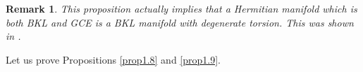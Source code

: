 \documentclass{amsart}
\numberwithin{equation}{section}
\newtheorem{remark}  [theorem]     {Remark}
\theoremstyle{definition}
\renewcommand{\1}{\mathds{1}}
\renewcommand{\>}{\rightarrow}
\begin{document}
\begin{remark}
This proposition actually implies that a Hermitian manifold which is both BKL and GCE is a BKL manifold with degenerate torsion. This was shown in \cite[Theorem 9]{YZZ}.
\end{remark}

Let us prove Propositions \ref{prop1.8} and \ref{prop1.9}. %
\end{document}
